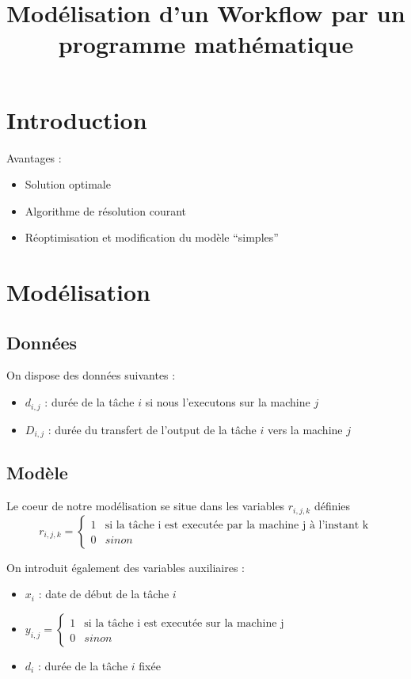 \documentclass{article}
\title{Modélisation d'un Workflow par un programme mathématique}
\begin{document}
 \maketitle
 \section{Introduction}
 Avantages : 
\begin{itemize}
  \item Solution optimale
  \item Algorithme de résolution courant
  \item Réoptimisation et modification du modèle ``simples''
\end{itemize}

 \section{Modélisation}
 \subsection{Données}
On dispose des données suivantes :
\begin{itemize}
  \item $d_{i,j}$ : durée de la tâche $i$ si nous l'executons sur la machine $j$
  \item $D_{i,j}$ : durée du transfert de l'output de la tâche $i$ vers la machine $j$
\end{itemize}
 \subsection{Modèle}
Le coeur de notre modélisation se situe dans les variables $r_{i,j,k}$ définies
$$
r_{i,j,k} = \left\{\begin{array}{ll}
                   1 & \textrm{si la tâche i est executée par la machine j à l'instant k} \\
                   0 & sinon
                  \end{array}
            \right.
$$

On introduit également des variables auxiliaires : 
\begin{itemize}
  \item $x_i$ : date de début de la tâche $i$
  \item $y_{i,j} = \left\{\begin{array}{ll}
                            1 & \textrm{si la tâche i est executée sur la machine j}\\
                            0 & sinon
                          \end{array}
                   \right.$
  \item $d_i$ : durée de la tâche $i$ fixée
\end{itemize}
\end{document}
